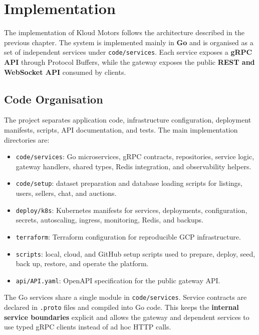 \chapter{Implementation} \label{cap:implementation}

The implementation of Kloud Motors follows the architecture described in the previous chapter. The system is implemented mainly in \textbf{Go} and is organised as a set of independent services under \texttt{code/services}. Each service exposes a \textbf{gRPC API} through Protocol Buffers, while the gateway exposes the public \textbf{REST and WebSocket API} consumed by clients.

\section{Code Organisation}

The project separates application code, infrastructure configuration, deployment manifests, scripts, API documentation, and tests. The main implementation directories are:

\begin{itemize}
    \item \texttt{code/services}: Go microservices, gRPC contracts, repositories, service logic, gateway handlers, shared types, Redis integration, and observability helpers.
    \item \texttt{code/setup}: dataset preparation and database loading scripts for listings, users, sellers, chat, and auctions.
    \item \texttt{deploy/k8s}: Kubernetes manifests for services, deployments, configuration, secrets, autoscaling, ingress, monitoring, Redis, and backups.
    \item \texttt{terraform}: Terraform configuration for reproducible GCP infrastructure.
    \item \texttt{scripts}: local, cloud, and GitHub setup scripts used to prepare, deploy, seed, back up, restore, and operate the platform.
    \item \texttt{api/API.yaml}: OpenAPI specification for the public gateway API.
\end{itemize}

The Go services share a single module in \texttt{code/services}. Service contracts are declared in \texttt{.proto} files and compiled into Go code. This keeps the \textbf{internal service boundaries} explicit and allows the gateway and dependent services to use typed gRPC clients instead of ad hoc HTTP calls.

